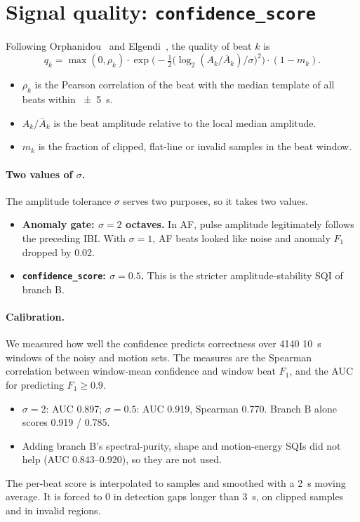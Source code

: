 \documentclass[10pt,a4paper]{article}
\newcommand{\code}[1]{\texttt{#1}}
\begin{document}
\section{Signal quality: \texorpdfstring{\code{confidence\_score}}{confidence score}}
Following Orphanidou~\cite{orphanidou} and Elgendi~\cite{elgendi2016}, the quality of beat $k$ is
\begin{equation}
  q_k = \max(0,\rho_k)\cdot \exp\!\Big(-\tfrac12\big(\log_2(A_k/\bar A_k)/\sigma\big)^2\Big)\cdot(1-m_k).
\end{equation}
\begin{itemize}
  \item $\rho_k$ is the Pearson correlation of the beat with the median template of all beats within \SI{\pm5}{s}.
  \item $A_k/\bar A_k$ is the beat amplitude relative to the local median amplitude.
  \item $m_k$ is the fraction of clipped, flat-line or invalid samples in the beat window.
\end{itemize}

\paragraph{Two values of $\sigma$.}
The amplitude tolerance $\sigma$ serves two purposes, so it takes two values.
\begin{itemize}
  \item \textbf{Anomaly gate: $\sigma=2$ octaves.} In AF, pulse amplitude legitimately follows the preceding IBI.
        With $\sigma=1$, AF beats looked like noise and anomaly $F_1$ dropped by 0.02.
  \item \textbf{\code{confidence\_score}: $\sigma=0.5$.} This is the stricter amplitude-stability SQI of branch B.
\end{itemize}

\paragraph{Calibration.}
We measured how well the confidence predicts correctness over 4140 \SI{10}{s} windows of the noisy and motion sets.
The measures are the Spearman correlation between window-mean confidence and window beat $F_1$, and the AUC for
predicting $F_1\ge0.9$.
\begin{itemize}
  \item $\sigma=2$: AUC 0.897; $\sigma=0.5$: AUC 0.919, Spearman 0.770. Branch B alone scores 0.919 / 0.785.
  \item Adding branch B's spectral-purity, shape and motion-energy SQIs did not help (AUC 0.843--0.920), so they
        are not used.
\end{itemize}
The per-beat score is interpolated to samples and smoothed with a \SI{2}{s} moving average. It is forced to 0 in
detection gaps longer than \SI{3}{s}, on clipped samples and in invalid regions.
\end{document}

